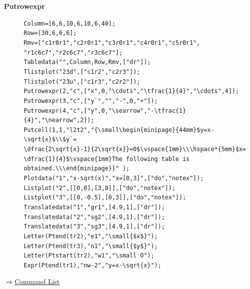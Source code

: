 \documentclass[papersize,a4paper,12pt]{article}
\newenvironment{cmd}[2]{
\hypertarget{#2}{}
\begin{center}{\bf\large #1}\end{center}
\begin{description}
}{
\end{description}
\begin{flushright} \hyperlink{functionlist}{$\Rightarrow$Command List}\end{flushright}
}
\newcommand{\itemket}[1]{
\item[\Ltab{27mm}{#1}]
}
\begin{document}
\begin{cmd}{Putrowexpr}{putrowexpr}
\itemket{Examples}\mbox{}

\verb|Column=[6,6,10,6,10,6,40];|\\
\verb|Row=[30,6,6,6];|\\
\verb|Rmv=["c1r0r1","c2r0r1","c3r0r1","c4r0r1","c5r0r1", "r1c6c7","r2c6c7","r3c6c7"];|\\
\verb|Tabledata("",Column,Row,Rmv,["dr"]);|\\
\verb|Tlistplot("23d",["c1r2","c2r3"]);|\\
\verb|Tlistplot("23u",["c1r3","c2r2"]);|\\
\verb|Putrowexpr(2,"c",["x",0,"\cdots","\tfrac{1}{4}","\cdots",4]);|\\
\verb|Putrowexpr(3,"c",["y`","","-",0,"+"]);|\\
\verb|Putrowexpr(4,"c",["y",0,"\searrow","-\tfrac{1}{4}","\nearrow",2]);|\\
\verb|Putcell(1,1,"l2t2","{\small\begin{minipage}{44mm}$y=x-\sqrt{x}$\\$y`=|\\
\verb|\dfrac{2\sqrt{x}-1}{2\sqrt{x}}=0$\vspace{1mm}\\\hspace*{5mm}$x=|\\
\verb|\dfrac{1}{4}$\vspace{1mm}The following table is obtained.\\\end{minipage}}" );|\\
\verb|Plotdata("1","x-sqrt(x)","x=[0,3]",["do","notex"]);|\\
\verb|Listplot("2",[[0,0],[3,0]],["do","notex"]);|\\
\verb|Listplot("3",[[0,-0.5],[0,3]],["do","notex"]);|\\
\verb|Translatedata("1","gr1",[4.9,1],["dr"]);|\\
\verb|Translatedata("2","sg2",[4.9,1],["dr"]);|\\
\verb|Translatedata("3","sg3",[4.9,1],["dr"]);|\\
\verb|Letter(Ptend(tr2),"e1","\small{$x$}");|\\
\verb|Letter(Ptend(tr3),"n1","\small{$y$}");|\\
\verb|Letter(Ptstart(tr2),"w1","\small O");|\\
\verb|Expr(Ptend(tr1),"nw-2","y=x-\sqrt{x}");|\\

\begin{center} 
 
\end{center}


\end{cmd}
\end{document}
